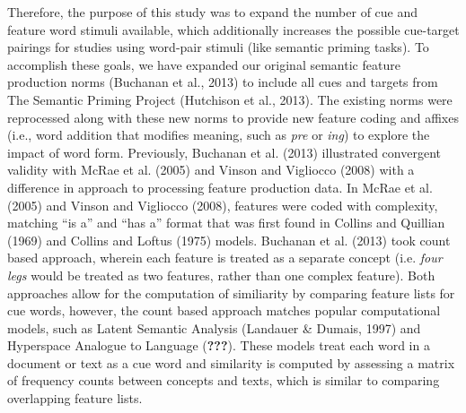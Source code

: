 \documentclass[english,,man]{apa6}
\theoremstyle{definition}
\theoremstyle{definition}
\theoremstyle{definition}
\theoremstyle{remark}
\begin{document}
Therefore, the purpose of this study was to expand the number of cue and
feature word stimuli available, which additionally increases the
possible cue-target pairings for studies using word-pair stimuli (like
semantic priming tasks). To accomplish these goals, we have expanded our
original semantic feature production norms (Buchanan et al., 2013) to
include all cues and targets from The Semantic Priming Project
(Hutchison et al., 2013). The existing norms were reprocessed along with
these new norms to provide new feature coding and affixes (i.e., word
addition that modifies meaning, such as \emph{pre} or \emph{ing}) to
explore the impact of word form. Previously, Buchanan et al. (2013)
illustrated convergent validity with McRae et al. (2005) and Vinson and
Vigliocco (2008) with a difference in approach to processing feature
production data. In McRae et al. (2005) and Vinson and Vigliocco (2008),
features were coded with complexity, matching \enquote{is a} and
\enquote{has a} format that was first found in Collins and Quillian
(1969) and Collins and Loftus (1975) models. Buchanan et al. (2013) took
count based approach, wherein each feature is treated as a separate
concept (i.e. \emph{four legs} would be treated as two features, rather
than one complex feature). Both approaches allow for the computation of
similiarity by comparing feature lists for cue words, however, the count
based approach matches popular computational models, such as Latent
Semantic Analysis (Landauer \& Dumais, 1997) and Hyperspace Analogue to
Language ({\textbf{???}}). These models treat each word in a document or
text as a cue word and similarity is computed by assessing a matrix of
frequency counts between concepts and texts, which is similar to
comparing overlapping feature lists.
\end{document}

